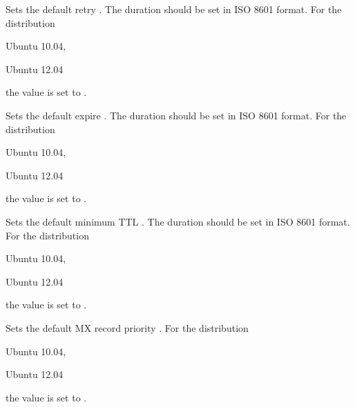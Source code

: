 Sets the default retry . The duration should be set in 
ISO 8601 format.
For the distribution
\begin{inparaitem}
\item[\TheDistribution{ubuntu}] Ubuntu 10.04,
\item[\TheDistribution{ubuntu}] Ubuntu 12.04
\end{inparaitem}
the value is set to .


Sets the default expire . The duration should be set in 
ISO 8601 format.
For the distribution
\begin{inparaitem}
\item[\TheDistribution{ubuntu}] Ubuntu 10.04,
\item[\TheDistribution{ubuntu}] Ubuntu 12.04
\end{inparaitem}
the value is set to .


Sets the default minimum TTL . The duration should be set in 
ISO 8601 format.
For the distribution
\begin{inparaitem}
\item[\TheDistribution{ubuntu}] Ubuntu 10.04,
\item[\TheDistribution{ubuntu}] Ubuntu 12.04
\end{inparaitem}
the value is set to .


Sets the default MX record priority .
For the distribution
\begin{inparaitem}
\item[\TheDistribution{ubuntu}] Ubuntu 10.04,
\item[\TheDistribution{ubuntu}] Ubuntu 12.04
\end{inparaitem}
the value is set to .
